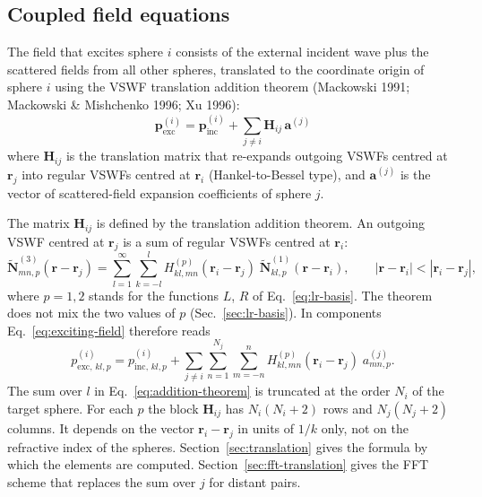 \documentclass[11pt,a4paper]{article}
\begin{document}
\subsection{Coupled field equations}

The field that excites sphere $i$ consists of the external incident wave plus the scattered fields from all other spheres, translated to the coordinate origin of sphere $i$ using the VSWF translation addition theorem (Mackowski 1991; Mackowski \& Mishchenko 1996; Xu 1996):
\begin{equation}
  \bm{p}_\mathrm{exc}^{(i)} = \bm{p}_\mathrm{inc}^{(i)} + \sum_{j \neq i} \mathbf{H}_{ij}\,\bm{a}^{(j)}
  \label{eq:exciting-field}
\end{equation}
where $\mathbf{H}_{ij}$ is the translation matrix that re-expands outgoing VSWFs centred at $\bm{r}_j$ into regular VSWFs centred at $\bm{r}_i$ (Hankel-to-Bessel type), and $\bm{a}^{(j)}$ is the vector of scattered-field expansion coefficients of sphere $j$.

The matrix $\mathbf{H}_{ij}$ is defined by the translation addition theorem.
An outgoing VSWF centred at $\bm{r}_j$ is a sum of regular VSWFs centred at $\bm{r}_i$:
\begin{equation}
  \tilde{\bm{N}}_{mn,p}^{(3)}(\bm{r} - \bm{r}_j)
  = \sum_{l=1}^{\infty} \sum_{k=-l}^{l} H^{(p)}_{kl,mn}(\bm{r}_i - \bm{r}_j)\;
    \tilde{\bm{N}}_{kl,p}^{(1)}(\bm{r} - \bm{r}_i),
  \qquad |\bm{r} - \bm{r}_i| < |\bm{r}_i - \bm{r}_j|,
  \label{eq:addition-theorem}
\end{equation}
where $p = 1, 2$ stands for the functions $L$, $R$ of Eq.~\eqref{eq:lr-basis}.
The theorem does not mix the two values of $p$ (Sec.~\ref{sec:lr-basis}).
In components Eq.~\eqref{eq:exciting-field} therefore reads
\begin{equation}
  p_{\mathrm{exc},\,kl,p}^{(i)} = p_{\mathrm{inc},\,kl,p}^{(i)}
  + \sum_{j \neq i} \sum_{n=1}^{N_j} \sum_{m=-n}^{n} H^{(p)}_{kl,mn}(\bm{r}_i - \bm{r}_j)\; a_{mn,p}^{(j)}.
  \label{eq:exciting-field-components}
\end{equation}
The sum over $l$ in Eq.~\eqref{eq:addition-theorem} is truncated at the order $N_i$ of the target sphere.
For each $p$ the block $\mathbf{H}_{ij}$ has $N_i(N_i+2)$ rows and $N_j(N_j+2)$ columns.
It depends on the vector $\bm{r}_i - \bm{r}_j$ in units of $1/k$ only, not on the refractive index of the spheres.
Section~\ref{sec:translation} gives the formula by which the elements are computed.
Section~\ref{sec:fft-translation} gives the FFT scheme that replaces the sum over $j$ for distant pairs.
\end{document}
